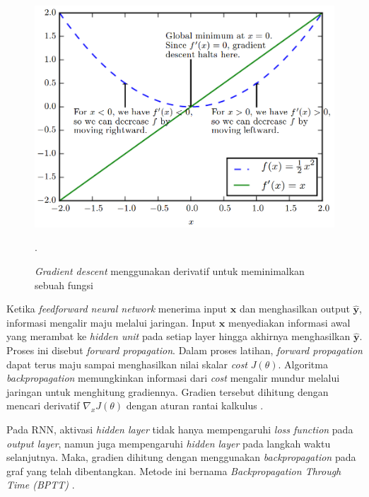 \begin{figure}
    \centering
    \includegraphics[width=12cm]{gambar/landasan-teori/gradient-descent.png}
    \caption{\textit{Gradient descent} menggunakan derivatif untuk meminimalkan sebuah fungsi \citep{goodfellow-2016}}.
    \label{gambar:gradient-descent}
\end{figure}

Ketika \textit{feedforward neural network} menerima input $\pmb{x}$ dan menghasilkan output $\pmb{\hat{y}}$, informasi mengalir maju melalui jaringan. Input $\pmb{x}$ menyediakan informasi awal yang merambat ke \textit{hidden unit} pada setiap layer hingga akhirnya menghasilkan $\pmb{\hat{y}}$. Proses ini disebut \textit{forward propagation}. Dalam proses latihan, \textit{forward propagation} dapat terus maju sampai menghasilkan nilai skalar \textit{cost} $J(\theta)$. Algoritma \textit{backpropagation} memungkinkan informasi dari \textit{cost} mengalir mundur melalui jaringan untuk menghitung gradiennya. Gradien tersebut dihitung dengan mencari derivatif $\nabla_x J(\theta)$ dengan aturan rantai kalkulus \citep{goodfellow-2016}.

Pada RNN, aktivasi \textit{hidden layer} tidak hanya mempengaruhi \textit{loss function} pada \textit{output layer}, namun juga mempengaruhi \textit{hidden layer} pada langkah waktu selanjutnya. Maka, gradien dihitung dengan menggunakan \textit{backpropagation} pada graf yang telah dibentangkan. Metode ini bernama \textit{Backpropagation Through Time (BPTT)} \citep{graves-2012}.


